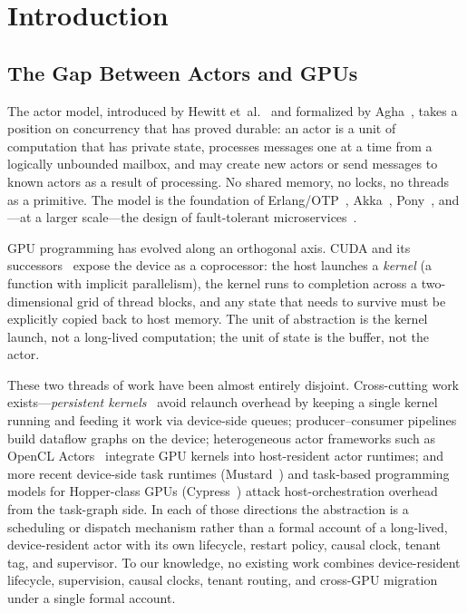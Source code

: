 \section{Introduction}
\label{sec:introduction}

\subsection{The Gap Between Actors and GPUs}

The actor model, introduced by Hewitt et~al.~\citep{hewitt1973actors}
and formalized by Agha~\citep{agha1986actors}, takes a position on
concurrency that has proved durable: an actor is a unit of
computation that has private state, processes messages one at a
time from a logically unbounded mailbox, and may create new actors
or send messages to known actors as a result of processing.  No
shared memory, no locks, no threads as a primitive.  The model is
the foundation of Erlang/OTP~\citep{armstrong2007erlang},
Akka~\citep{akka2010}, Pony~\citep{clebsch2015pony}, and—at a
larger scale—the design of fault-tolerant
microservices~\citep{vernon2015reactive}.

GPU programming has evolved along an orthogonal axis.  CUDA and its
successors~\citep{nickolls2008cuda} expose the device as a
coprocessor: the host launches a \emph{kernel} (a function with
implicit parallelism), the kernel runs to completion across a
two-dimensional grid of thread blocks, and any state that needs to
survive must be explicitly copied back to host memory.  The unit of
abstraction is the kernel launch, not a long-lived computation; the
unit of state is the buffer, not the actor.

These two threads of work have been almost entirely
disjoint.  Cross-cutting work exists—\emph{persistent
kernels}~\citep{gupta2012persistent,aila2009raytrace} avoid relaunch
overhead by keeping a single kernel running and feeding it work via
device-side queues; producer–consumer pipelines~\citep{steinberger2014whippletree}
build dataflow graphs on the device; heterogeneous actor frameworks
such as OpenCL Actors~\citep{hiesgen2018opencl} integrate GPU
kernels into host-resident actor runtimes; and more recent
device-side task runtimes (Mustard~\citep{mustard2025}) and
task-based programming models for Hopper-class GPUs
(Cypress~\citep{cypress2025}) attack host-orchestration overhead
from the task-graph side.  In each of those directions the
abstraction is a scheduling or dispatch mechanism rather than a
formal account of a long-lived, device-resident actor with its own
lifecycle, restart policy, causal clock, tenant tag, and
supervisor.  To our knowledge, no existing work combines
device-resident lifecycle, supervision, causal clocks, tenant
routing, and cross-GPU migration under a single formal account.

